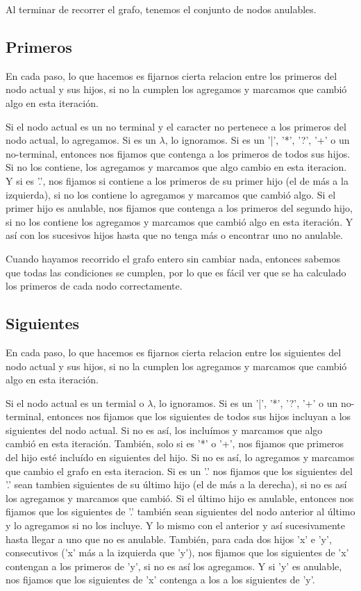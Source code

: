 \documentclass[a4paper]{report}
\begin{document}
	Al terminar de recorrer el grafo, tenemos el conjunto de nodos
anulables.

\subsection*{Primeros}

	En cada paso, lo que hacemos es fijarnos cierta relacion entre los primeros
del nodo actual y sus hijos, si no la cumplen los agregamos y marcamos que
cambió algo en esta iteración.


	Si el nodo actual es un no terminal y el caracter no pertenece a los
primeros del nodo actual, lo agregamos. Si es un $\lambda$, lo ignoramos. Si es un
'|', '*', '?', '+' o un no-terminal, entonces nos fijamos que contenga a los
primeros de todos sus hijos. Si no los contiene, los agregamos y marcamos que
algo cambio en esta iteracion. Y si es '.', nos fijamos si contiene a los
primeros de su primer hijo (el de más a la izquierda), si no los contiene lo
agregamos y marcamos que cambió algo. Si el primer hijo es anulable, nos fijamos
que contenga a los primeros del segundo hijo, si no los contiene los agregamos y
marcamos que cambió algo en esta iteración. Y así con los sucesivos hijos hasta
que no tenga más o encontrar uno no anulable.


	Cuando hayamos recorrido el grafo entero sin cambiar nada, entonces
sabemos que todas las condiciones se cumplen, por lo que es fácil ver que se ha
calculado los primeros de cada nodo correctamente.


\subsection*{Siguientes}

	En cada paso, lo que hacemos es fijarnos cierta relacion entre los
siguientes del nodo actual y sus hijos, si no la cumplen los agregamos y marcamos que
cambió algo en esta iteración.


	Si el nodo actual es un termial o $\lambda$, lo ignoramos. Si es un '|',
'*', '?', '+' o un no-terminal, entonces nos fijamos que los siguientes de todos
sus hijos incluyan a los siguientes del nodo actual. Si no es así, los incluímos
y marcamos que algo cambió en esta iteración. También, solo si es '*' o '+', nos
fijamos que primeros del hijo esté incluído en siguientes del hijo. Si no es
así, lo agregamos y marcamos que cambio el grafo en esta iteracion.
Si es un '.' nos fijamos que los
siguientes del '.' sean tambien siguientes de su último hijo (el de más a la
derecha), si no es así los agregamos y marcamos que cambió. Si el último hijo es
anulable, entonces nos fijamos que los siguientes de '.' también sean siguientes
del nodo anterior al último y lo agregamos si no los incluye. Y lo mismo con el
anterior y así sucesivamente hasta llegar a uno que no es anulable. También,
para cada dos hijos 'x' e 'y', consecutivos ('x' más a la izquierda que 'y'),
nos fijamos que los siguientes de 'x' contengan a los primeros de 'y', si no es
así los agregamos. Y si 'y' es anulable, nos fijamos que los siguientes de 'x'
contenga a los a los siguientes de 'y'.
\end{document}
